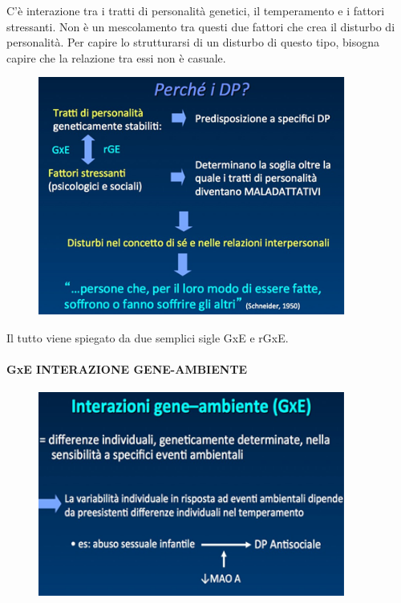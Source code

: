 C'è interazione tra i tratti di personalità genetici, il temperamento e
i fattori stressanti. Non è un mescolamento tra questi due fattori che
crea il disturbo di personalità. Per capire lo strutturarsi di un
disturbo di questo tipo, bisogna capire che la relazione tra essi non è
casuale.

\begin{figure}[!ht]
\centering
	\includegraphics[width=0.9\textwidth]{011/image4.png}
\end{figure}

Il tutto viene spiegato da due semplici sigle GxE e rGxE.

\paragraph{GxE INTERAZIONE GENE-AMBIENTE}

\begin{figure}[!ht]
\centering
	\includegraphics[width=0.9\textwidth]{011/image5.png}
\end{figure}

